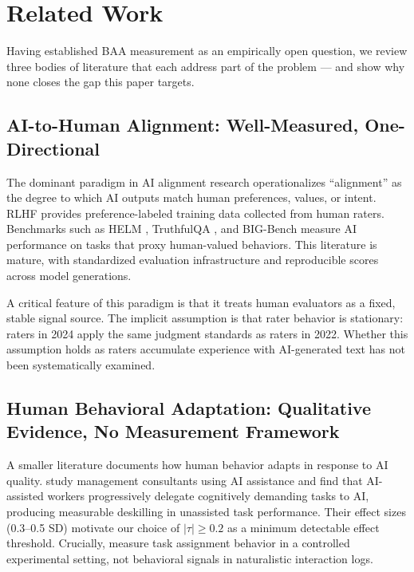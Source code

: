 \section{Related Work}
\label{sec:related}

Having established BAA measurement as an empirically open question, we review three bodies of literature that each address part of the problem --- and show why none closes the gap this paper targets.

\subsection{AI-to-Human Alignment: Well-Measured, One-Directional}

The dominant paradigm in AI alignment research operationalizes ``alignment'' as the degree to which AI outputs match human preferences, values, or intent. RLHF \citep{Ouyang2022Training, Bai2022Training} provides preference-labeled training data collected from human raters. Benchmarks such as HELM \citep{Liang2022Holistic}, TruthfulQA \citep{Lin2022TruthfulQA}, and BIG-Bench \citep{Srivastava2022Beyond} measure AI performance on tasks that proxy human-valued behaviors. This literature is mature, with standardized evaluation infrastructure and reproducible scores across model generations.

A critical feature of this paradigm is that it treats human evaluators as a fixed, stable signal source. The implicit assumption is that rater behavior is stationary: raters in 2024 apply the same judgment standards as raters in 2022. Whether this assumption holds as raters accumulate experience with AI-generated text has not been systematically examined.

\subsection{Human Behavioral Adaptation: Qualitative Evidence, No Measurement Framework}

A smaller literature documents how human behavior adapts in response to AI quality. \citet{Dell2023Navigating} study management consultants using AI assistance and find that AI-assisted workers progressively delegate cognitively demanding tasks to AI, producing measurable deskilling in unassisted task performance. Their effect sizes (0.3--0.5 SD) motivate our choice of $|\tau| \geq 0.2$ as a minimum detectable effect threshold. Crucially, \citet{Dell2023Navigating} measure task assignment behavior in a controlled experimental setting, not behavioral signals in naturalistic interaction logs.

